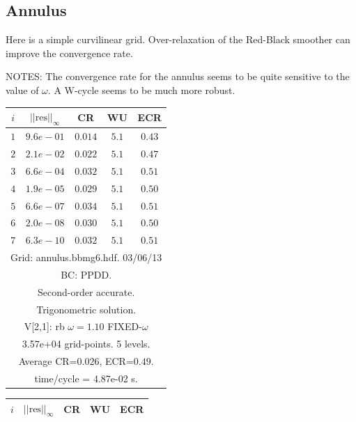 \clearpage
\subsection{Annulus}
  
   Here is a simple curvilinear grid. Over-relaxation of the Red-Black smoother can improve the
convergence rate.

NOTES: The convergence rate for the annulus seems to be quite sensitive to the value of $\omega$.
A W-cycle seems to be much more robust.

\begin{table}[hbt]
\begin{center}
{\tablefontsize
\begin{tabular}{|c|c|c|c|c|} \hline 
 $i$   & $\vert\vert\mbox{res}\vert\vert_\infty$  &  CR     &  WU    & ECR  \\   \hline 
 $ 1$  & $ 9.6e-01$ & $0.014$ & $ 5.1$ & $0.43$ \\ 
 $ 2$  & $ 2.1e-02$ & $0.022$ & $ 5.1$ & $0.47$ \\ 
 $ 3$  & $ 6.6e-04$ & $0.032$ & $ 5.1$ & $0.51$ \\ 
 $ 4$  & $ 1.9e-05$ & $0.029$ & $ 5.1$ & $0.50$ \\ 
 $ 5$  & $ 6.6e-07$ & $0.034$ & $ 5.1$ & $0.51$ \\ 
 $ 6$  & $ 2.0e-08$ & $0.030$ & $ 5.1$ & $0.50$ \\ 
 $ 7$  & $ 6.3e-10$ & $0.032$ & $ 5.1$ & $0.51$ \\ 
\hline 
\multicolumn{5}{|c|}{Grid: annulus.bbmg6.hdf. 03/06/13}  \\
\multicolumn{5}{|c|}{BC: PPDD.}  \\
\multicolumn{5}{|c|}{Second-order accurate.}  \\
\multicolumn{5}{|c|}{Trigonometric solution.}  \\
\multicolumn{5}{|c|}{V[2,1]: rb $\omega=1.10$ FIXED-$\omega$}  \\
\multicolumn{5}{|c|}{3.57e+04 grid-points. 5 levels.}  \\
\multicolumn{5}{|c|}{Average CR=$0.026$, ECR=$0.49$.}  \\
\multicolumn{5}{|c|}{time/cycle = 4.87e-02 s.}  \\
\hline 
\end{tabular}
\begin{tabular}{|c|c|c|c|c|} \hline 
 $i$   & $\vert\vert\mbox{res}\vert\vert_\infty$  &  CR     &  WU    & ECR  \\   \hline 

\end{tabular}}
\end{center}
\end{table}
